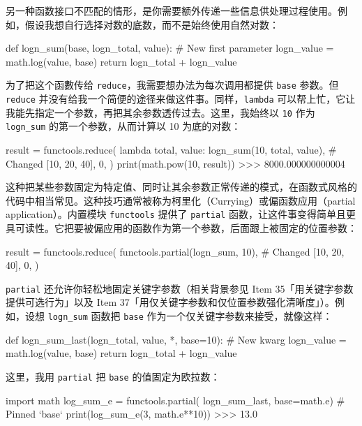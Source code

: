 另一种函数接口不匹配的情形，是你需要额外传递一些信息供处理过程使用。例如，假设我想自行选择对数的底数，而不是始终使用自然对数：

\begin{codebox}[python]
def logn_sum(base, logn_total, value):  # New first parameter
    logn_value = math.log(value, base)
    return logn_total + logn_value
\end{codebox}

为了把这个函數传给 \texttt{reduce}，我需要想办法为每次调用都提供 \texttt{base} 参数。但 \texttt{reduce} 并没有给我一个简便的途径来做这件事。同样，\texttt{lambda} 可以帮上忙，它让我能先指定一个参数，再把其余参数透传过去。这里，我始终以 \texttt{10} 作为 \texttt{logn\_sum} 的第一个参数，从而计算以 10 为底的对数：

\begin{codebox}[python]
result = functools.reduce(
    lambda total, value: logn_sum(10, total, value),  # Changed
    [10, 20, 40],
    0,
)
print(math.pow(10, result))
>>>
8000.000000000004
\end{codebox}

这种把某些参数固定为特定值、同时让其余参数正常传递的模式，在函数式风格的代码中相当常见。这种技巧通常被称为柯里化（Currying）或偏函数应用（partial application）。内置模块 \texttt{functools} 提供了 \texttt{partial} 函数，让这件事变得简单且更具可读性。它把要被偏应用的函数作为第一个参数，后面跟上被固定的位置参数：

\begin{codebox}[python]
result = functools.reduce(
    functools.partial(logn_sum, 10),  # Changed
    [10, 20, 40],
    0,
)
\end{codebox}

\texttt{partial} 还允许你轻松地固定关键字参数（相关背景参见 Item 35「用关键字参数提供可选行为」以及 Item 37「用仅关键字参数和仅位置参数强化清晰度」）。例如，设想 \texttt{logn\_sum} 函数把 \texttt{base} 作为一个仅关键字参数来接受，就像这样：

\begin{codebox}[python]
def logn_sum_last(logn_total, value, *, base=10):  # New kwarg
    logn_value = math.log(value, base)
    return logn_total + logn_value
\end{codebox}

这里，我用 \texttt{partial} 把 \texttt{base} 的值固定为欧拉数：

\begin{codebox}[python]
import math
log_sum_e = functools.partial( logn_sum_last,
base=math.e)  # Pinned `base`
print(log_sum_e(3, math.e**10))
>>>
13.0
\end{codebox}

